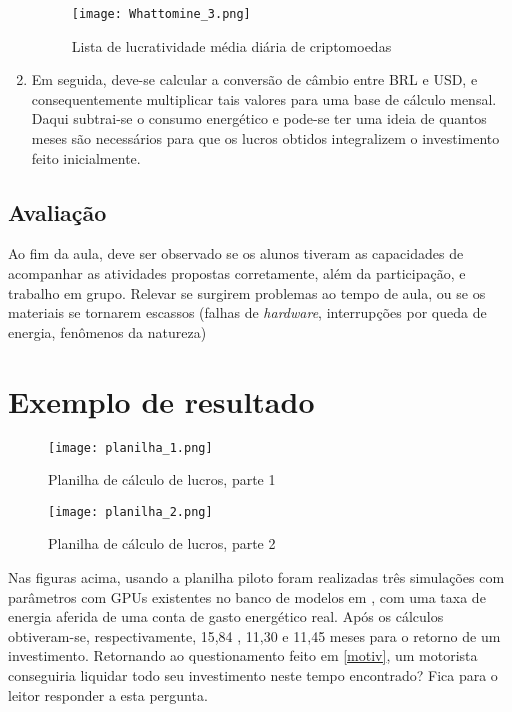 \begin{enumerate}
	\begin{figure}[H]
		\centering
		\caption{Lista de lucratividade média diária de criptomoedas}
		\texttt{[image: Whattomine\_3.png]}
		\\ 
	\end{figure}
	
	\item Em seguida, deve-se calcular a conversão de câmbio entre BRL e USD, e consequentemente multiplicar tais valores para uma base de cálculo mensal. Daqui subtrai-se o consumo energético e pode-se ter uma ideia de quantos meses são necessários para que os lucros obtidos integralizem o investimento feito inicialmente. 

\end{enumerate}

 \subsection{Avaliação} 
 Ao fim da aula, deve ser observado se os alunos tiveram as capacidades de acompanhar as atividades propostas corretamente, além da participação, e trabalho em grupo. Relevar se surgirem problemas ao tempo de aula, ou se os materiais se tornarem escassos (falhas de \textit{hardware}, interrupções por queda de energia, fenômenos da natureza)
 
 \section{Exemplo de resultado}
 \begin{figure}[H] \label{result1}
 	\centering
 	\caption{Planilha de cálculo de lucros, parte 1}
 	\texttt{[image: planilha\_1.png]}
 \end{figure}
 
 \begin{figure}[H]  \label{result2} \label{example_sheet}
 	\centering
 	\caption{Planilha de cálculo de lucros, parte 2}
 	\texttt{[image: planilha\_2.png]}\\
 \end{figure}

 Nas figuras acima, usando a planilha piloto foram realizadas três simulações com parâmetros com GPUs existentes no banco de modelos  em \cite{WTM}, com uma taxa de energia aferida de uma conta de gasto energético real.  Após os cálculos obtiveram-se, respectivamente, 15,84 , 11,30 e 11,45 meses para o retorno de um investimento. Retornando ao questionamento feito em \ref{motiv}, um motorista conseguiria liquidar todo seu investimento neste tempo encontrado? Fica para o leitor responder a esta pergunta.
 






